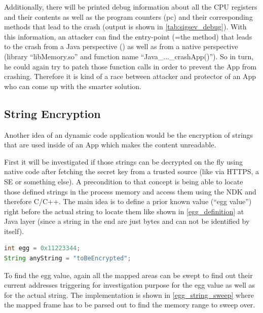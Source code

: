 Additionally, there will be printed debug information about all the CPU
registers and their contents as well as the program counters (pc) and
their corresponding methods that lead to the crash (output is shown in
\autoref{tab:sigsev_debug}). With this information, an attacker can find
the entry-point (=the method) that leads to the crash from a Java perspective
() as well as from a native perspective
(library ``libMemory.so'' and function name ``Java\_...\_crashApp()'').
So in turn, he could again try to patch
those function calls in order to prevent the App from crashing.
Therefore it is kind of a race between attacker and protector of an App who can come up with the smarter solution.

\subsection{String Encryption}\label{section:string_encryption}
Another idea of an dynamic code application would be the encryption of strings
that are used inside of an App which makes the content unreadable.

First it will be investigated if those strings can be decrypted on the
fly using native code after fetching the secret key from a trusted source
(like via HTTPS, a SE or something else).
A precondition to that concept is being able to locate those defined strings
in the process memory and access them using the NDK and therefore C/C++.
The main idea is to define a prior known value (``egg value'') right before the actual string to locate them like shown in \autoref{egg_definition} at Java
layer (since a string in the end are just bytes and can not be identified by
itself).
\begin{lstlisting}[language=Java, caption=Egg Value Defining, label=egg_definition]
int egg = 0x11223344;
String anyString = "toBeEncrypted";
\end{lstlisting}
To find the egg value, again all the mapped areas can be swept to find
out their current addresses triggering for investigation purpose for
the egg value as well as for the actual string. The implementation is
shown in \autoref{egg_string_sweep} where the mapped frame has to be
parsed out to find the memory range to sweep over.

